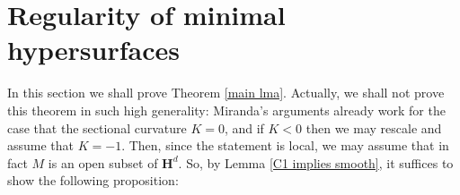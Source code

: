 \documentclass[reqno,10pt]{amsart}
\newcommand{\RR}{\mathbf{R}}
\newcommand{\Hyp}{\mathbf H}
\DeclareMathOperator{\Cyl}{Cyl}
\DeclareMathOperator{\diam}{diam}
\newcommand*\dif{\mathop{}\!\mathrm{d}}
\DeclareMathOperator{\dist}{dist}
\newcommand{\normal}{\mathbf n}
\newcommand{\dfn}[1]{\emph{#1}\index{#1}}
\newtheorem{lemma}[theorem]{Lemma}
\theoremstyle{definition}
\newtheorem{definition}[theorem]{Definition}
\numberwithin{equation}{section}
\begin{document}






\section{Regularity of minimal hypersurfaces}\label{de Giorgi section}
In this section we shall prove Theorem \ref{main lma}.
Actually, we shall not prove this theorem in such high generality: Miranda's arguments already work for the case that the sectional curvature $K = 0$, and if $K < 0$ then we may rescale and assume that $K = -1$.
Then, since the statement is local, we may assume that in fact $M$ is an open subset of $\Hyp^d$.
So, by Lemma \ref{C1 implies smooth}, it suffices to show the following proposition:
\end{document}
